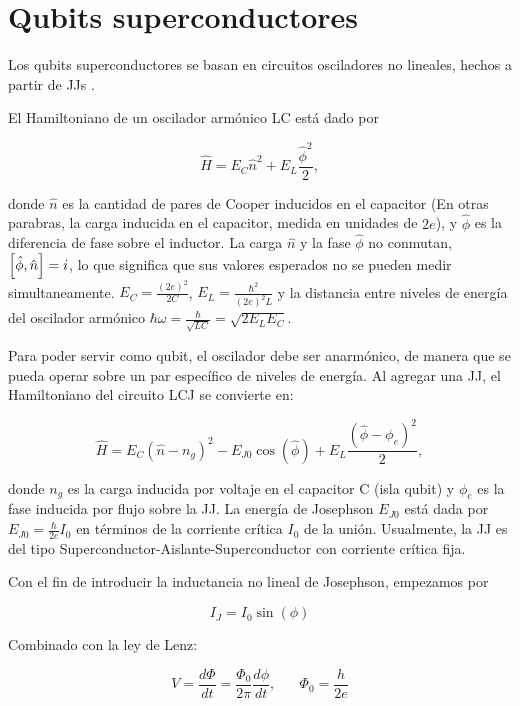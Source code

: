 \section{Qubits superconductores}
Los qubits superconductores se basan en circuitos osciladores no lineales, hechos a partir de JJs \cite{wendin}.
\vspace{0.5cm}

El Hamiltoniano de un oscilador armónico LC está dado por 

\begin{equation}
\hat{H} = E_C \hat{n}^2 + E_L \frac{\hat{\phi}^2}{2},
\end{equation}

donde $\hat{n}$ es la cantidad de pares de Cooper inducidos en el capacitor (En otras parabras, la carga inducida en el capacitor, medida en unidades de $2e$), y $\hat{\phi}$ es la diferencia de fase sobre el inductor. La carga $\hat{n}$ y la fase $\hat{\phi}$ no conmutan, $\comm{\hat{\phi}}{\hat{n}}=i$, lo que significa que sus valores esperados no se pueden medir simultaneamente. $E_C=\frac{(2e)^2}{2C}$, $E_L=\frac{\hbar^2}{(2e)^2L}$ y la distancia entre niveles de energía del oscilador armónico $\hbar \omega = \frac{\hbar}{\sqrt{LC}}=\sqrt{2E_LE_C}$.
\vspace{0.5cm}

Para poder servir como qubit, el oscilador debe ser anarmónico, de manera que se pueda operar sobre un par específico de niveles de energía. Al agregar una JJ, el Hamiltoniano del circuito LCJ se convierte en:

\[
\hat{H} = E_C (\hat{n}-n_g)^2 - E_{J0} \cos( \hat{\phi} ) + E_L \frac{(\hat{\phi}-\phi_e)^2}{2},
\]

donde $n_g$ es la carga inducida por voltaje en el capacitor C (isla qubit) y $\phi_e$ es la fase inducida por flujo sobre la JJ. La energía de Josephson $E_{J0}$ está dada por $E_{J0}=\frac{\hbar}{2e}I_0$ en términos de la corriente crítica $I_0$ de la unión. Usualmente, la JJ es del tipo Superconductor-Aislante-Superconductor con corriente crítica fija.

Con el fin de introducir la inductancia no lineal de Josephson, empezamos por 

\[
I_J = I_0 \sin(\phi)
\]

Combinado con la ley de Lenz:

\[
V = \frac{d\Phi}{dt} = \frac{\Phi_0}{2\pi} \frac{d\phi}{dt}, \hspace{20pt} \Phi_0=\frac{h}{2e}
\]

